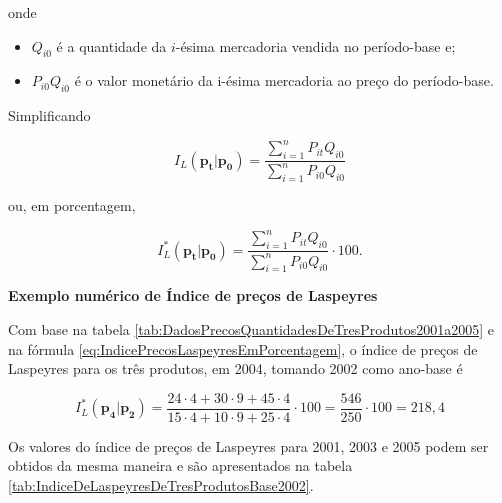 \documentclass[
]{book}
\providecommand{\tightlist}{%
  \setlength{\itemsep}{0pt}\setlength{\parskip}{0pt}}
\begin{document}
onde

\begin{itemize}
\tightlist
\item
  \(Q_{i0}\) é a quantidade da \(i\)-ésima mercadoria vendida no período-base e;
\item
  \(P_{i0}Q_{i0}\) é o valor monetário da i-ésima mercadoria ao preço do período-base.
\end{itemize}

Simplificando

\begin{equation}
  I_L(\mathbf{p_t}| \mathbf{p_0}) =
  \frac{\sum_{i=1}^{n}P_{it}Q_{i0}}{\sum_{i=1}^{n}P_{i0}Q_{i0}}
  \label{eq:IndicePrecosLaspeyres}
\end{equation}

ou, em porcentagem,

\begin{equation}
  I_L^*(\mathbf{p_t}| \mathbf{p_0}) =
  \frac{\sum_{i=1}^{n}P_{it}Q_{i0}}{\sum_{i=1}^{n}P_{i0}Q_{i0}}\cdot 100.
  \label{eq:IndicePrecosLaspeyresEmPorcentagem}
\end{equation}

\textbf{Exemplo numérico de Índice de preços de Laspeyres}

Com base na tabela \ref{tab:DadosPrecosQuantidadesDeTresProdutos2001a2005} e na fórmula \eqref{eq:IndicePrecosLaspeyresEmPorcentagem}, o índice de preços de Laspeyres para os três
produtos, em 2004, tomando 2002 como ano-base é

\begin{equation}
  I_L^*(\mathbf{p_4}| \mathbf{p_2}) = \frac{24\cdot 4 + 30\cdot 9 +
  45\cdot 4}{15\cdot 4 + 10\cdot 9 + 25\cdot 4}\cdot 100 =
  \frac{546}{250}\cdot 100 = 218,4
\end{equation}

Os valores do índice de preços de Laspeyres para 2001, 2003 e 2005 podem ser obtidos
da mesma maneira e são apresentados na tabela \ref{tab:IndiceDeLaspeyresDeTresProdutosBase2002}.
\end{document}
